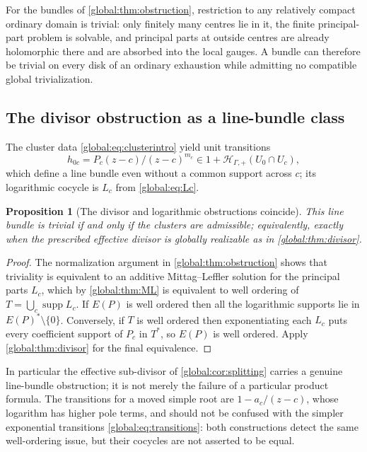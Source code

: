 \documentclass[11pt,letterpaper]{article}
\newtheorem{proposition}[proposition]{Proposition}
\theoremstyle{definition}
\theoremstyle{remark}
\newcommand{\HP}{\mathscr H_{\Gamma,+}}
\newcommand{\supp}{\operatorname{supp}}
\numberwithin{equation}{section}
\begin{document}
For the bundles of \cref{global:thm:obstruction}, restriction to any relatively compact ordinary domain is trivial: only finitely many centres lie in it, the finite principal-part problem is solvable, and principal parts at outside centres are already holomorphic there and are absorbed into the local gauges. A bundle can therefore be trivial on every disk of an ordinary exhaustion while admitting no compatible global trivialization.

\subsection{The divisor obstruction as a line-bundle class}

The cluster data \eqref{global:eq:clusterintro} yield unit transitions
\[
  h_{0c}=P_c(z-c)/(z-c)^{m_c}\in1+\HP(U_0\cap U_c),
\]
which define a line bundle even without a common support across $c$; its logarithmic cocycle is $L_c$ from \eqref{global:eq:Lc}.

\begin{proposition}[The divisor and logarithmic obstructions coincide]\label{global:prop:divPic}
This line bundle is trivial if and only if the clusters are admissible; equivalently, exactly when the prescribed effective divisor is globally realizable as in \cref{global:thm:divisor}.
\end{proposition}

\begin{proof}
The normalization argument in \cref{global:thm:obstruction} shows that triviality is equivalent to an additive Mittag--Leffler solution for the principal parts $L_c$, which by \cref{global:thm:ML} is equivalent to well ordering of $T=\bigcup_c\supp L_c$. If $E(P)$ is well ordered then all the logarithmic supports lie in $E(P)^*\setminus\{0\}$. Conversely, if $T$ is well ordered then exponentiating each $L_c$ puts every coefficient support of $P_c$ in $T^*$, so $E(P)$ is well ordered. Apply \cref{global:thm:divisor} for the final equivalence.
\end{proof}

In particular the effective sub-divisor of \cref{global:cor:splitting} carries a genuine line-bundle obstruction; it is not merely the failure of a particular product formula. The transitions for a moved simple root are $1-a_c/(z-c)$, whose logarithm has higher pole terms, and should not be confused with the simpler exponential transitions \eqref{global:eq:transitions}: both constructions detect the same well-ordering issue, but their cocycles are not asserted to be equal.
\end{document}
